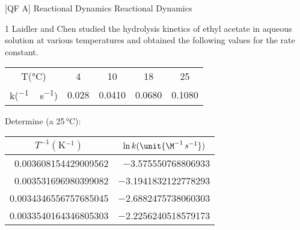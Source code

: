 \documentclass[\mainfilename]{subfiles}
\begin{document}
\graphicspath{{\subfix{./.build/figures/QF_A-Listas_Resolução.2}}}

[QF A]
{Reactional Dynamics} %
{Reactional Dynamics} %

\begin{questionBox}1{ %
    Laidler and Chen studied the hydrolysis kinetics of ethyl acetate in aqueous solution at various temperatures and obtained the following values for the rate constant.
} %
    \begin{center}
        \begin{tabular}{c *{4}{c}}
            
            \\\toprule
            
                T(\unit{\celsius})
                & 4 & 10 & 18 & 25
                \\
                k(\unit{\M^{-1}\,s^{-1}})
                & 0.028 & 0.0410 & 0.0680 & 0.1080
            
            \\\bottomrule
            
        \end{tabular}
    \end{center}

    Determine (a 25\,\unit{\celsius}):
    
    \begin{center}
        \begin{tabular}{*{2}{r}}
            
            \\\toprule
            
                \multicolumn{1}{c}{\(T^{-1}(\unit{\kelvin^{-1}})\)}
                & \multicolumn{1}{c}{\(\ln{k}(\unit{\M^{-1}\,s^{-1}})\)}

            \\\midrule

                   \num{0.003608154429009562}  & \num{-3.575550768806933}
                \\ \num{0.003531696980399082}  & \num{-3.1941832122778293}
                \\ \num{0.0034346556757685045} & \num{-2.6882475738060303}
                \\ \num{0.0033540164346805303} & \num{-2.2256240518579173}
            

\end{tabular}
\end{center}
\end{questionBox}
\end{document}
